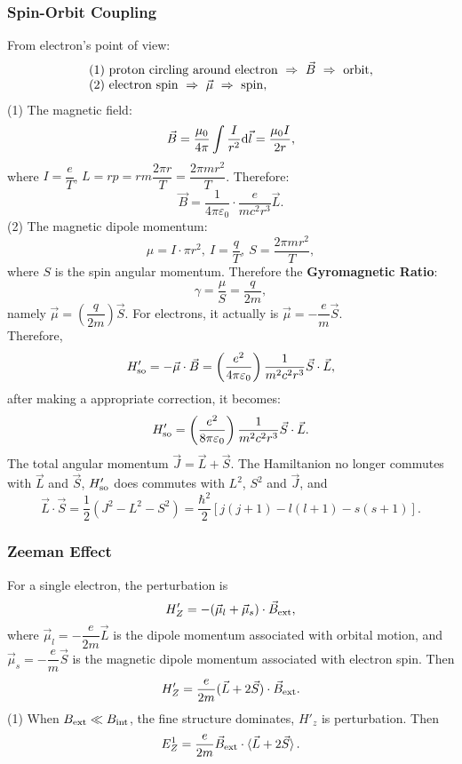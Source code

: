 \documentclass[12pt, 
]{article}
\begin{document}
\subsubsection{Spin-Orbit Coupling}
From electron's point of view:
\[
	\begin{array}{l}
		(1)~{\rm proton~circling~around~electron}~\Rightarrow~\vec{B}~\Rightarrow~{\rm orbit},\\
		(2)~{\rm electron~spin}~\Rightarrow~\vec{\mu}~\Rightarrow~{\rm spin},
	\end{array}
\]
(1) The magnetic field:
\[
	\vec{B}=\frac{\mu_0}{4\pi}\int\frac{I}{r^2}{\rm d}\vec{l}=\frac{\mu_0I}{2r},
\]
where $I=\dfrac{e}{T}$, $L=rp=rm\dfrac{2\pi r}{T}=\dfrac{2\pi m r^2}{T}$. Therefore:
\[
	\vec{B}=\frac{1}{4\pi\varepsilon_0}\cdot\frac{e}{mc^2r^3}\vec{L}.
\]
(2) The magnetic dipole momentum:
\[
	\mu=I\cdot\pi r^2, ~I=\frac{q}{T},~S=\frac{2\pi m r^2}{T},
\]
where $S$ is the spin angular momentum. Therefore the {\bf Gyromagnetic Ratio}:
\[
	\gamma=\frac{\mu}{S}=\frac{q}{2m},
\]
namely $\vec{\mu}=\left(\dfrac{q}{2m}\right)\vec{S}$. For electrons, it actually is $\vec{\mu}=-\dfrac{e}{m}\vec{S}$.\\
Therefore,
\begin{eqnarray*}
	H'_{\rm so}=-\vec{\mu}\cdot\vec{B}=\left(\frac{e^2}{4\pi\varepsilon_0}\right)\frac{1}{m^2c^2r^3}\vec{S}\cdot\vec{L},
\end{eqnarray*}
after making a appropriate correction, it becomes:
\[
	H'_{\rm so}=\left(\frac{e^2}{8\pi\varepsilon_0}\right)\frac{1}{m^2c^2r^3}\vec{S}\cdot\vec{L}.
\]
The total angular momentum $\vec{J}=\vec{L}+\vec{S}$. The Hamiltanion no longer commutes with $\vec{L}$ and $\vec{S}$, $H'_{\rm so}$ does commutes with $L^2$, $S^2$ and $\vec{J}$, and 
\[
	\vec{L}\cdot\vec{S}=\frac{1}{2}(J^2-L^2-S^2)=\frac{\hbar^2}{2}[j(j+1)-l(l+1)-s(s+1)].
\]

\subsubsection{Zeeman Effect}
For a single electron, the perturbation is \[
	H'_Z=-(\vec{\mu}_l+\vec{\mu}_s)\cdot\vec{B}_{\rm ext},
\]
where $\vec{\mu}_l=-\dfrac{e}{2m}\vec{L}$ is the dipole momentum associated with orbital motion, and $\vec{\mu}_s=-\dfrac{e}{m}\vec{S}$ is the magnetic dipole momentum associated with electron spin. Then
\[	
	H'_Z=\frac{e}{2m}(\vec{L}+2\vec{S})\cdot\vec{B}_{\rm ext}.
\]
(1) When $B_{\rm ext}\ll B_{\rm int}$, the fine structure dominates, $H'_z$ is perturbation. Then
\[
	E_Z^1=\frac{e}{2m}\vec{B}_{\rm ext}\cdot\braket{\vec{L}+2\vec{S}}.
\]
\end{document}
